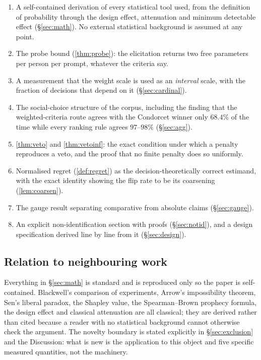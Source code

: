 \begin{enumerate}
\item A self-contained derivation of every statistical tool used, from the
      definition of probability through the design effect, attenuation and
      minimum detectable effect (§\ref{sec:math}). No external statistical
      background is assumed at any point.
\item The probe bound (\cref{thm:probe}): the elicitation returns two free
      parameters per person per prompt, whatever the criteria say.
\item A measurement that the weight scale is used as an \emph{interval} scale,
      with the fraction of decisions that depend on it (§\ref{sec:cardinal}).
\item The social-choice structure of the corpus, including the finding that the
      weighted-criteria route agrees with the Condorcet winner only $68.4\%$ of
      the time while every ranking rule agrees $97$--$98\%$ (§\ref{sec:agg}).
\item \cref{thm:veto} and \cref{thm:vetoinf}: the exact condition under which a
      penalty reproduces a veto, and the proof that no finite penalty does so
      uniformly.
\item Normalised regret (\cref{def:regret}) as the decision-theoretically correct
      estimand, with the exact identity showing the flip rate to be its coarsening
      (\cref{lem:coarsen}).
\item The gauge result separating comparative from absolute claims
      (§\ref{sec:gauge}).
\item An explicit non-identification section with proofs (§\ref{sec:notid}), and
      a design specification derived line by line from it (§\ref{sec:design}).
\end{enumerate}

\subsection{Relation to neighbouring work}

Everything in §\ref{sec:math} is standard and is reproduced only so the paper is
self-contained. Blackwell's comparison of experiments, Arrow's impossibility
theorem, Sen's liberal paradox, the Shapley value, the Spearman--Brown prophecy
formula, the design effect and classical attenuation are all classical; they are
derived rather than cited because a reader with no statistical background cannot
otherwise check the argument. The novelty boundary is stated explicitly in
§\ref{sec:exclusion} and the Discussion: what is new is the application to this
object and five specific measured quantities, not the machinery.

